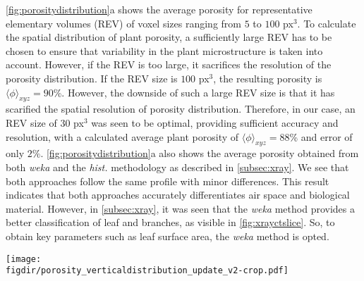 \cref{fig:porositydistribution}a shows the average porosity for representative elementary volumes (REV) of voxel sizes ranging from $5$ to $100$ px$^3$. To calculate the spatial distribution of plant porosity, a sufficiently large REV has to be chosen to ensure that variability in the plant microstructure is taken into account. However, if the REV is too large, it sacrifices the resolution of the porosity distribution. If the REV size is $100$ px$^3$, the resulting porosity is $\langle \phi \rangle_{\textit{xyz}}  = 90$\%. However, the downside of such a large REV size is that it has scarified the spatial resolution of porosity distribution. Therefore, in our case, an REV size of $30$ px$^3$ was seen to be optimal, providing sufficient accuracy and resolution, with a calculated average plant porosity of $\langle \phi \rangle_{\textit{xyz}} = 88$\% and error of only $2\%$. \cref{fig:porositydistribution}a also shows the average porosity obtained from both \textit{weka} and the \textit{hist.} methodology as described in \cref{subsec:xray}. We see that both approaches follow the same profile with minor differences. This result indicates that both approaches accurately differentiates air space and biological material. However, in \cref{subsec:xray}, it was seen that the \textit{weka} method provides a better classification of leaf and branches, as visible in \cref{fig:xrayctslice}. So, to obtain key parameters such as leaf surface area, the \textit{weka} method is opted.

\begin{sidewaysfigure}[p]
		\centering
		\texttt{[image: \\figdir/porosity\_verticaldistribution\_update\_v2-crop.pdf]}
		\caption{ Average plant porosity$\langle \phi \rangle_{xyz}$ with respect to voxel size (px$^3$) as a base for determining the REV for calculating porosity distribution,  Three vertical porosity distributions: optical $\beta$, aerodynamic $\alpha$ and true porosity $\langle \phi \rangle_{xy}$, and  leaf area density $\langle a \rangle_{xy}$ (m$^2$ m$^{-3}$) (blue) and normalized short-wave radiative flux $q_{\textit{r,sw}}$ profile (red) inside vegetation determined using Beer-Lambert law extinction coefficient of short-wave radiation $\mu=0.78$ \citep{Manickathan2018a}.}
		\label{fig:porositydistribution}
\end{sidewaysfigure}

